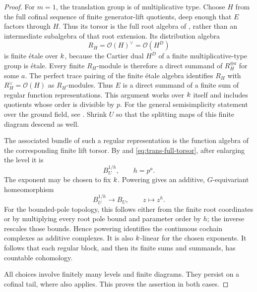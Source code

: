 \begin{proof}
For $m=1$, the translation group is of multiplicative type.  Choose
$H$ from the full cofinal sequence of finite generator-lift quotients,
deep enough that $E$ factors through $H$.  Thus its torsor is the full
root algebra of , rather than an intermediate
subalgebra of that root extension.  Its
distribution algebra
\[
 R_H=\mathcal O(H)^\vee=\mathcal O(H^D)
\]
is finite \'etale over $k$, because the Cartier dual $H^D$ of a finite
multiplicative-type group is \'etale.  Every finite $R_H$-module is
therefore a direct summand of $R_H^{\oplus a}$ for some $a$.
The perfect trace pairing of the finite \'etale algebra identifies
$R_H$ with $R_H^\vee=\mathcal O(H)$ as $R_H$-modules.  Thus $E$ is a
direct summand of a finite sum of regular function representations.
This argument works over $k$ itself and includes quotients whose
order is divisible by $p$.
For the general semisimplicity statement over the ground field, see
\citet[Theorem~12.30, pp.~241--242]{milne2017}.
Shrink $U$ so that the splitting maps of this finite diagram descend as well.

The associated bundle of such a regular representation is the function
algebra of the corresponding finite lift torsor.  By
 and \eqref{eq:trans-full-torsor}, after enlarging
the level it is
\[
 B_U^{1/h},\qquad h=p^a.
\]
The exponent may be chosen to fix $k$.  Powering gives an additive,
$G$-equivariant homeomorphism
\begin{equation}\label{eq:coeff-root-powering}
 B_U^{1/h}\longrightarrow B_U,\qquad z\longmapsto z^h.
\end{equation}
For the bounded-pole topology, this follows either from the finite root
coordinates or by multiplying every root pole bound and parameter order
by $h$; the inverse rescales those bounds.  Hence powering identifies
the continuous cochain complexes as additive complexes.  It is also
$k$-linear for the chosen exponents.  It follows that each regular
block, and then its finite sums and summands, has countable cohomology.

All choices involve finitely many levels and finite diagrams.  They persist on a
cofinal tail, where  also applies.  This proves
the assertion in both cases.
\end{proof}


